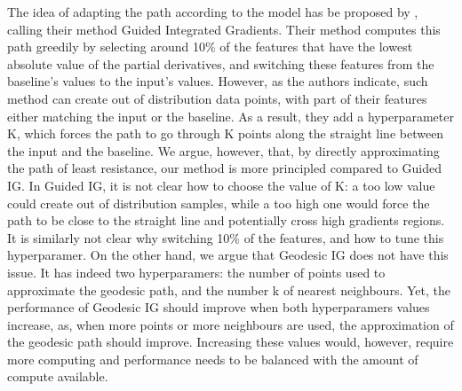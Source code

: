 The idea of adapting the path according to the model has be proposed by \citet{kapishnikov2021guided}, calling their method Guided Integrated Gradients. Their method computes this path greedily by selecting around 10\% of the features that have the lowest absolute value of the partial derivatives, and switching these features from the baseline's values to the input's values. However, as the authors indicate, such method can create out of distribution data points, with part of their features either matching the input or the baseline. As a result, they add a hyperparameter K, which forces the path to go through K points along the straight line between the input and the baseline. 
We argue, however, that, by directly approximating the path of least resistance, our method is more principled compared to Guided IG. In Guided IG, it is not clear how to choose the value of K: a too low value could create out of distribution samples, while a too high one would force the path to be close to the straight line and potentially cross high gradients regions. It is similarly not clear why switching 10\% of the features, and how to tune this hyperparamer. On the other hand, we argue that Geodesic IG does not have this issue. It has indeed two hyperparamers: the number of points used to approximate the geodesic path, and the number k of nearest neighbours. Yet, the performance of Geodesic IG should improve when both hyperparamers values increase, as, when more points or more neighbours are used, the approximation of the geodesic path should improve. Increasing these values would, however, require more computing and performance needs to be balanced with the amount of compute available.